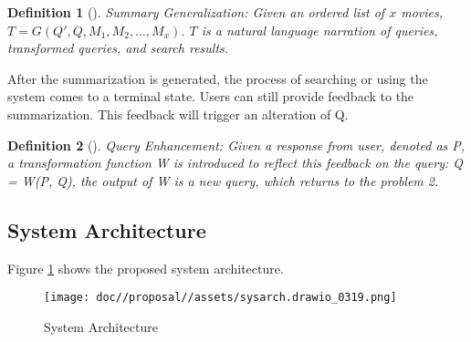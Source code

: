 \documentclass[journal]{IEEEtran}
\theoremstyle{mydefstyle}
\newtheorem{definition}{Definition}[section]
\begin{document}
\begin{adjustwidth}{0.75cm}{} \begin{definition}[]
\textit{Summary Generalization:} Given an ordered list of \( x \) movies, \( T = G(Q', Q, M_1, M_2, \ldots, M_x) \). \( T \) is a natural language narration of queries, transformed queries, and search results.
\end{definition} \end{adjustwidth}

\vspace{10pt} 

After the summarization is generated, the process of searching or using the system comes to a terminal state. Users can still provide feedback to the summarization. This feedback will trigger an alteration of Q. 

\begin{adjustwidth}{0.75cm}{} \begin{definition}[]
\textit{Query Enhancement:} Given a response from user, denoted as P, a transformation function W is introduced to reflect this feedback on the query: Q = W(P, Q), the output of W is a new query, which returns to the problem 2.
\end{definition} \end{adjustwidth}


\subsection{System Architecture}
Figure \ref{fig:sysarch} shows the proposed system architecture.


\begin{figure}
    \centering
    \texttt{[image: doc//proposal//assets/sysarch.drawio\_0319.png]}
    \caption{System Architecture}
    \label{fig:sysarch}
\end{figure}
\end{document}
